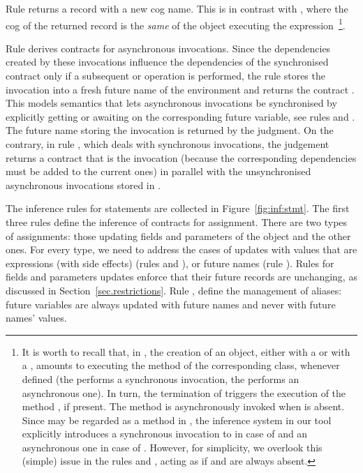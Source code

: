 Rule  returns a record with a new cog name. This is 
in contrast with , where the cog of the returned record is the
\emph{same} of the  object executing 
the expression~\footnote{\label{footnote.new}It is worth to recall that, in {\coreABS}, 
the creation of an object, either with a 
 or with a , amounts to executing the method  of 
the corresponding 
class, whenever defined (the  performs a synchronous invocation, 
the  performs an asynchronous one). 
In turn, the termination of
  triggers the execution of the method
, if 
present. The method  is asynchronously invoked when 
is absent.
Since  may be regarded as a method in {\coreABS}, the inference
system in our tool explicitly introduces a synchronous invocation to 
in case of  and an asynchronous one in case of . However,
for simplicity, we overlook this (simple) issue in the rules  and 
,
acting as if  and  are always absent.}.

Rule  derives contracts for asynchronous invocations. Since the
dependencies created by these invocations influence the 
dependencies of the synchronised contract only if a subsequent 
 or  operation is performed, the rule stores the invocation into
a fresh future name of the environment and returns the contract . 
This models {\coreABS} semantics that lets asynchronous invocations be synchronised 
by explicitly getting or awaiting on the corresponding future variable,
see rules  and . The future name storing the invocation
is returned by the judgment. 
On the contrary, in rule , which deals with synchronous invocations,
the judgement returns a contract that is the invocation (because the corresponding 
dependencies must be added to the current ones) in parallel with the unsynchronised
asynchronous invocations stored in . 

\smallskip

The inference rules for statements are collected in Figure~\ref{fig:inf:stmt}.
The first three rules define the inference of contracts for assignment. There are
two types of assignments: those updating fields and parameters of the 
object and the other ones. For every type, we need to address the cases of updates with values
that are expressions (with side effects) (rules  and 
),
or future names (rule ). 
Rules for fields and parameters updates enforce that their future records are unchanging, as
discussed in Section~\ref{sec.restrictions}. 
Rule , 
 define the management 
of aliases: future variables are always updated with future names and never with 
future names' values.

